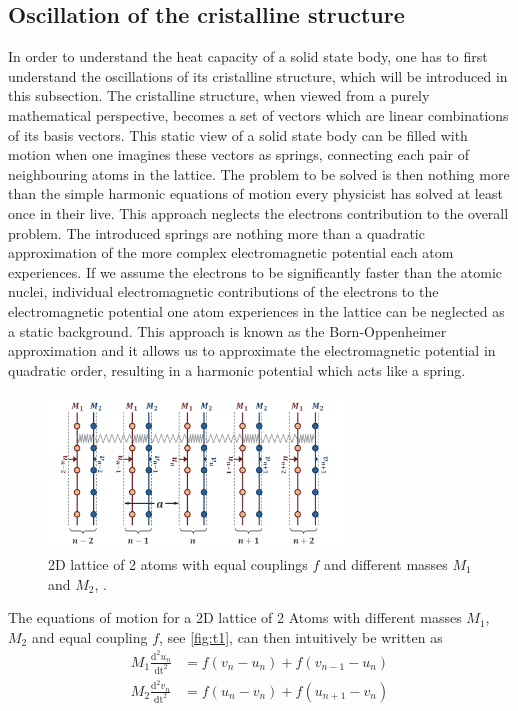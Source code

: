 \subsection{Oscillation of the cristalline structure}
In order to understand the heat capacity of a solid state body, one has to first understand the oscillations of its cristalline structure, which will be introduced in this subsection.
The cristalline structure, when viewed from a purely mathematical perspective, becomes a set of vectors which are linear combinations of its basis vectors. This static view of a solid state body can be filled with motion when one imagines these vectors as springs, connecting each pair of neighbouring atoms in the lattice. The problem to be solved is then nothing more than the simple harmonic equations of motion every physicist has solved at least once in their live.
This approach neglects the electrons contribution to the overall problem. The introduced springs are nothing more than a quadratic approximation of the more complex electromagnetic potential each atom experiences. If we assume the electrons to be significantly faster than the atomic nuclei, individual electromagnetic contributions of the electrons to the electromagnetic potential one atom experiences in the lattice can be neglected as a static background.
This approach is known as the Born-Oppenheimer approximation and it allows us to approximate the electromagnetic potential in quadratic order, resulting in a harmonic potential which acts like a spring.
\begin{figure}[H]
    \centering
    \includegraphics[width=0.7\textwidth]{lattice.pdf}
    \caption{2D lattice of 2 atoms with equal couplings $f$ and different masses $M_1$ and $M_2$, \cite{rehab}.}
    \label{fig:t1}
\end{figure}
\noindent
The equations of motion for a 2D lattice of 2 Atoms with different masses $M_1$, $M_2$ and equal coupling $f$, see \autoref{fig:t1}, can then intuitively be written as 
\begin{align}
    M_1 \frac{\text{d}^2 u_n}{\text{dt}^2} &= f \left( v_n - u_n \right) + f \left( v_{n-1} - u_n \right) \\
    M_2 \frac{\text{d}^2 v_n}{\text{dt}^2} &= f \left( u_n - v_n \right) + f \left( u_{n+1} - v_n \right)
\end{align}
